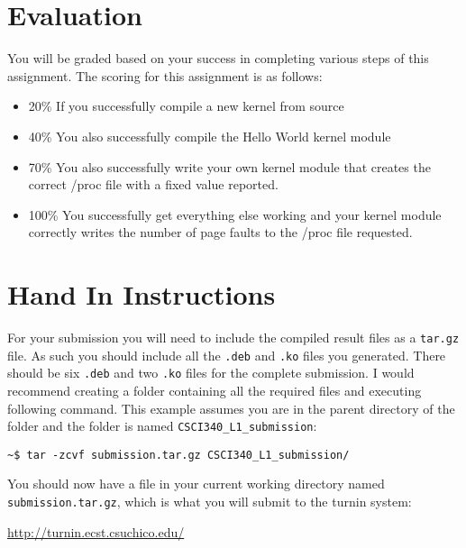 \documentclass[11pt]{article}
\begin{document}
\section*{Evaluation}

You will be graded based on your success in completing various steps of this assignment. The scoring for this assignment is as follows:

\begin{itemize}
\item 20\% If you successfully compile a new kernel from source
\item 40\% You also successfully compile the Hello World kernel module
\item 70\% You also successfully write your own kernel module that creates the correct /proc file with a fixed value reported.
\item 100\% You successfully get everything else working and your kernel module correctly writes the number of page faults to the /proc file requested. 
\end{itemize}


\section*{Hand In Instructions}

For your submission you will need to include the compiled result files as a \texttt{tar.gz} file. As such you should include all the \texttt{.deb} and \texttt{.ko} files you generated. There should be six \texttt{.deb} and two \texttt{.ko} files for the complete submission. I would recommend creating a folder containing all the required files and executing following command. This example assumes you are in the parent directory of the folder and the folder is named \texttt{CSCI340\_L1\_submission}:

\begin{verbatim}
~$ tar -zcvf submission.tar.gz CSCI340_L1_submission/
\end{verbatim}

You should now have a file in your current working directory named \texttt{submission.tar.gz}, which is what you will submit to the turnin system:

\url{http://turnin.ecst.csuchico.edu/}
\end{document}
